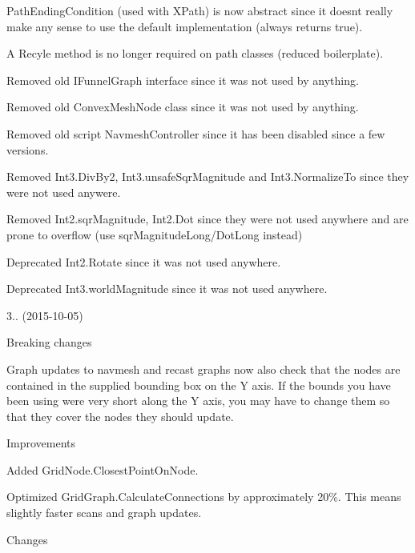 \begin{DoxyItemize}
\begin{DoxyItemize}
\begin{DoxyItemize}
\item Path\+Ending\+Condition (used with X\+Path) is now abstract since it doesn\textquotesingle{}t really make any sense to use the default implementation (always returns true).
\item A \textquotesingle{}Recyle\textquotesingle{} method is no longer required on path classes (reduced boilerplate).
\item Removed old I\+Funnel\+Graph interface since it was not used by anything.
\item Removed old Convex\+Mesh\+Node class since it was not used by anything.
\item Removed old script Navmesh\+Controller since it has been disabled since a few versions.
\item Removed Int3.\+Div\+By2, Int3.\+unsafe\+Sqr\+Magnitude and Int3.\+Normalize\+To since they were not used anywere.
\item Removed Int2.\+sqr\+Magnitude, Int2.\+Dot since they were not used anywhere and are prone to overflow (use sqr\+Magnitude\+Long/\+Dot\+Long instead)
\item Deprecated Int2.\+Rotate since it was not used anywhere.
\item Deprecated Int3.\+world\+Magnitude since it was not used anywhere.
\end{DoxyItemize}
\end{DoxyItemize}
\item 3.. (2015-\/10-\/05)
\begin{DoxyItemize}
\item Breaking changes
\begin{DoxyItemize}
\item Graph updates to navmesh and recast graphs now also check that the nodes are contained in the supplied bounding box on the Y axis. If the bounds you have been using were very short along the Y axis, you may have to change them so that they cover the nodes they should update.
\end{DoxyItemize}
\item Improvements
\begin{DoxyItemize}
\item Added Grid\+Node.\+Closest\+Point\+On\+Node.
\item Optimized Grid\+Graph.\+Calculate\+Connections by approximately 20\%. This means slightly faster scans and graph updates.
\end{DoxyItemize}
\item Changes
\begin{DoxyItemize}

\end{DoxyItemize}
\end{DoxyItemize}
\end{DoxyItemize}
